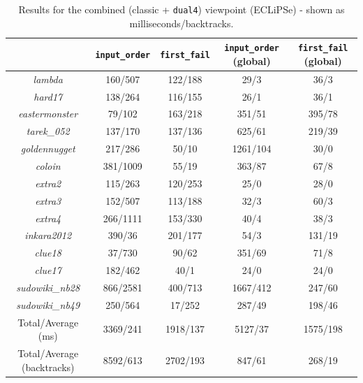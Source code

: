 \begin{table}[H]
\centering
\footnotesize
\bgroup
\def\arraystretch{1.3}
\begin{tabular}{ccc|cc}
\multicolumn{1}{l}{}    & \texttt{input\_order} & \texttt{first\_fail} & \texttt{input\_order} (global) & \texttt{first\_fail} (global) \\ \hline
\textit{lambda} & 160/507 & 122/188 & 29/3 & 36/3 \\
\textit{hard17}  & 138/264 & 116/155 & 26/1 & 36/1 \\
\textit{eastermonster} & 79/102 & 163/218 & 351/51 & 395/78 \\
\textit{tarek\_052} & 137/170 & 137/136 & 625/61 & 219/39 \\
\textit{goldennugget} & 217/286 & 50/10 & 1261/104 & 30/0 \\
\textit{coloin} & 381/1009 & 55/19 & 363/87 & 67/8 \\
\textit{extra2} & 115/263 & 120/253 & 25/0 & 28/0 \\
\textit{extra3} & 152/507 & 113/188 & 32/3 & 60/3 \\
\textit{extra4} & 266/1111 & 153/330 & 40/4 & 38/3 \\
\textit{inkara2012} & 390/36 & 201/177 & 54/3 & 131/19 \\
\textit{clue18} & 37/730 & 90/62 & 351/69 & 71/8 \\
\textit{clue17} & 182/462 & 40/1 & 24/0 & 24/0 \\
\textit{sudowiki\_nb28} & 866/2581 & 400/713 & 1667/412 & 247/60 \\
\textit{sudowiki\_nb49} & 250/564 & 17/252 & 287/49 & 198/46 \\\hline
Total/Average (ms) & 3369/241 & 1918/137 & 5127/37 & 1575/198 \\
Total/Average (backtracks) & 8592/613 & 2702/193 & 847/61 & 268/19
\end{tabular}
\egroup
\caption{Results for the combined (classic + \texttt{dual4}) viewpoint (ECLiPSe) - shown as milliseconds/backtracks.}
\label{tab:res3}
\end{table}

